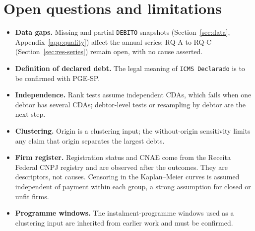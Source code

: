 \section{Open questions and limitations}\label{sec:limits}
\begin{itemize}
\item \textbf{Data gaps.} Missing and partial \texttt{DEBITO} snapshots (Section~\ref{sec:data}, Appendix~\ref{app:quality}) affect the annual series; RQ-A to RQ-C (Section~\ref{sec:res-series}) remain open, with no cause asserted.
\item \textbf{Definition of declared debt.} The legal meaning of \texttt{ICMS Declarado} is to be confirmed with PGE-SP.
\item \textbf{Independence.} Rank tests assume independent CDAs, which fails when one debtor has several CDAs; debtor-level tests or resampling by debtor are the next step.
\item \textbf{Clustering.} Origin is a clustering input; the without-origin sensitivity limits any claim that origin separates the largest debts.
\item \textbf{Firm register.} Registration status and CNAE come from the Receita Federal CNPJ registry and are observed after the outcomes. They are descriptors, not causes. Censoring in the Kaplan--Meier curves is assumed independent of payment within each group, a strong assumption for closed or unfit firms.
\item \textbf{Programme windows.} The instalment-programme windows used as a clustering input are inherited from earlier work and must be confirmed.
\end{itemize}
